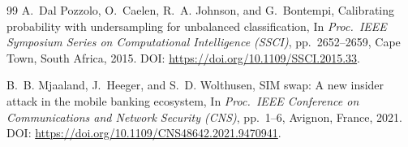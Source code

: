 {\begin{thebibliography}{99}
\hypertarget{cite.dalpozzolo2015}{}
A.~Dal Pozzolo, O.~Caelen, R.~A. Johnson, and G.~Bontempi,
\newblock Calibrating probability with undersampling for unbalanced classification,
\newblock In \emph{Proc.\ IEEE Symposium Series on Computational Intelligence (SSCI)}, pp.~2652--2659, Cape Town, South Africa, 2015.
\newblock DOI: \url{https://doi.org/10.1109/SSCI.2015.33}.

\hypertarget{cite.mjaaland2021}{}
B.~B. Mjaaland, J.~Heeger, and S.~D. Wolthusen,
\newblock SIM swap: A new insider attack in the mobile banking ecosystem,
\newblock In \emph{Proc.\ IEEE Conference on Communications and Network Security (CNS)}, pp.~1--6, Avignon, France, 2021.
\newblock DOI: \url{https://doi.org/10.1109/CNS48642.2021.9470941}.

\end{thebibliography}
}
